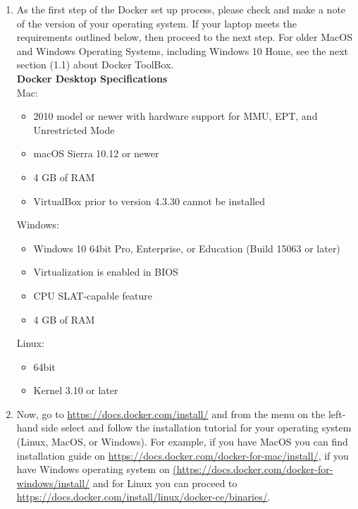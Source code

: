 \begin{enumerate}
	\item As the first step of the Docker set up process, please check and make a note of the version of your operating system. If your laptop meets the requirements outlined below, then proceed to the next step. For older MacOS and Windows Operating Systems, including Windows 10 Home, see the next section (1.1) about Docker ToolBox.
 \\
 
 \textbf{Docker Desktop Specifications} \\
 Mac: 
 	\begin{itemize}
 		\item 2010 model or newer with hardware support for MMU, EPT, and Unrestricted Mode
 		\item macOS Sierra 10.12 or newer
 		\item 4 GB of RAM
 		\item VirtualBox prior to version 4.3.30 cannot be installed
	\end{itemize}
Windows: 
 	\begin{itemize}
		\item Windows 10 64bit Pro, Enterprise, or Education (Build 15063 or later)
		\item Virtualization is enabled in BIOS
		\item CPU SLAT-capable feature
		\item 4 GB of RAM
	\end{itemize}
Linux: 
 	\begin{itemize}
		\item 64bit
		\item Kernel 3.10 or later
	\end{itemize}
	\item Now, go to \url{https://docs.docker.com/install/} and  from the menu on the left-hand side select and follow the installation tutorial for your operating system (Linux, MacOS, or Windows). For example, if you have  
 MacOS you can find installation guide on \url{https://docs.docker.com/docker-for-mac/install/}, if you have Windows operating system on \url{ (https://docs.docker.com/docker-for-windows/install/} and for Linux you can proceed to \url{https://docs.docker.com/install/linux/docker-ce/binaries/}. 
 

\end{enumerate}
